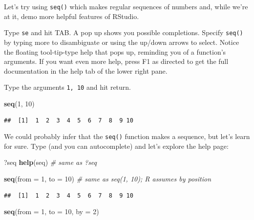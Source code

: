 \documentclass[]{book}
\newenvironment{Shaded}{\begin{snugshade}}{\end{snugshade}}
\newcommand{\KeywordTok}[1]{\textcolor[rgb]{0.13,0.29,0.53}{\textbf{#1}}}
\newcommand{\DataTypeTok}[1]{\textcolor[rgb]{0.13,0.29,0.53}{#1}}
\newcommand{\DecValTok}[1]{\textcolor[rgb]{0.00,0.00,0.81}{#1}}
\newcommand{\CommentTok}[1]{\textcolor[rgb]{0.56,0.35,0.01}{\textit{#1}}}
\newcommand{\NormalTok}[1]{#1}
\theoremstyle{definition}
\theoremstyle{definition}
\theoremstyle{definition}
\theoremstyle{remark}
\begin{document}
Let's try using \texttt{seq()} which makes regular sequences of numbers
and, while we're at it, demo more helpful features of RStudio.

Type \texttt{se} and hit TAB. A pop up shows you possible completions.
Specify \texttt{seq()} by typing more to disambiguate or using the
up/down arrows to select. Notice the floating tool-tip-type help that
pops up, reminding you of a function's arguments. If you want even more
help, press F1 as directed to get the full documentation in the help tab
of the lower right pane.

Type the arguments \texttt{1,\ 10} and hit return.

\begin{Shaded}
\begin{Highlighting}[]
\KeywordTok{seq}\NormalTok{(}\DecValTok{1}\NormalTok{, }\DecValTok{10}\NormalTok{)}
\end{Highlighting}
\end{Shaded}

\begin{verbatim}
##  [1]  1  2  3  4  5  6  7  8  9 10
\end{verbatim}

We could probably infer that the \texttt{seq()} function makes a
sequence, but let's learn for sure. Type (and you can autocomplete) and
let's explore the help page:

\begin{Shaded}
\begin{Highlighting}[]
\NormalTok{?seq }
\KeywordTok{help}\NormalTok{(seq) }\CommentTok{# same as ?seq}
\end{Highlighting}
\end{Shaded}

\begin{Shaded}
\begin{Highlighting}[]
\KeywordTok{seq}\NormalTok{(}\DataTypeTok{from =} \DecValTok{1}\NormalTok{, }\DataTypeTok{to =} \DecValTok{10}\NormalTok{) }\CommentTok{# same as seq(1, 10); R assumes by position}
\end{Highlighting}
\end{Shaded}

\begin{verbatim}
##  [1]  1  2  3  4  5  6  7  8  9 10
\end{verbatim}

\begin{Shaded}
\begin{Highlighting}[]
\KeywordTok{seq}\NormalTok{(}\DataTypeTok{from =} \DecValTok{1}\NormalTok{, }\DataTypeTok{to =} \DecValTok{10}\NormalTok{, }\DataTypeTok{by =} \DecValTok{2}\NormalTok{)}
\end{Highlighting}
\end{Shaded}
\end{document}
